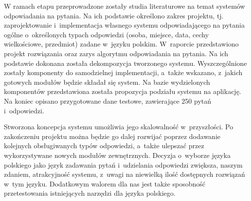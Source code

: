 W ramach etapu przeprowadzone zostały studia literaturowe na temat systemów odpowiadania na pytania. Na ich podstawie określono zakres projektu, tj. zaprojektowanie i~implementacja własnego systemu odpowiadającego na pytania ogólne o~określonych typach odpowiedzi (osoba, miejsce, data, cechy wielkościowe, przedmiot) zadane w~języku polskim. W~raporcie przedstawiono projekt rozwiązania oraz zarys algorytmu odpowiadania na pytania.  Na ich podstawie dokonana została dekompozycja tworzonego systemu. Wyszczególnione zostały komponenty do samodzielnej implementacji, a~także wskazano, z~jakich gotowych modułów będzie składał się system. Na bazie wydzielonych komponentów przedstawiona została propozycja podziału systemu na aplikację. Na koniec opisano przygotowane dane testowe, zawierające 250 pytań i~odpowiedzi.


Stworzona koncepcja systemu umożliwia jego skalowalność w~przyszłości. Po zakończeniu projektu można będzie go dalej rozwijać poprzez dodawanie kolejnych obsługiwanych typów odpowiedzi, a~także ulepszać przez wykorzystywane nowych modułów zewnętrznych.  Decyzja o~wyborze języka polskiego jako język zadawania pytań i~udzielania odpowiedzi zwiększa, naszym zdaniem, atrakcyjność systemu, z~uwagi na niewielką ilość dostępnych rozwiązań w~tym języku. Dodatkowym walorem dla nas jest także sposobność przetestowania istniejących narzędzi dla języka polskiego.